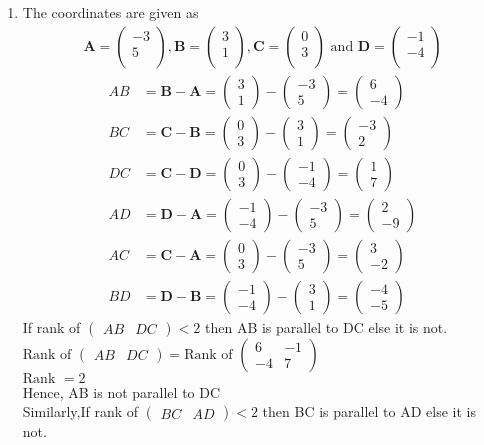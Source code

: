 \documentclass[12pt]{article}
\newcommand{\myvec}[1]{\ensuremath{\begin{pmatrix}#1\end{pmatrix}}}
\let\vec\mathbf
\begin{document}
\begin{enumerate}
\item The coordinates are given as
	\begin{align}
	\vec{A} = \myvec{
		-3\\
		5\\
		},
	\vec{B} = \myvec{
		3\\
		1\\
		},
	\vec{C} = \myvec{
		0\\
		3\\
		} \text{ and }
	\vec{D} = \myvec{
		-1\\
		-4\\
		}
	\end{align}
	\begin{align}
		AB &= \vec{B} - \vec{A} = \myvec{3\\1} - \myvec{-3\\5} = \myvec{6\\-4}\\
		BC &= \vec{C} - \vec{B} = \myvec{0\\3} - \myvec{3\\1} = \myvec{-3\\2}\\
		DC &= \vec{C} - \vec{D} = \myvec{0\\3} - \myvec{-1\\-4} = \myvec{1\\7}\\
		AD &= \vec{D} - \vec{A} = \myvec{-1\\-4} - \myvec{-3\\5} = \myvec{2\\-9}\\
		AC &= \vec{C} - \vec{A} = \myvec{0\\3} - \myvec{-3\\5} = \myvec{3\\-2}\\
		BD &= \vec{D} - \vec{B} = \myvec{-1\\-4} - \myvec{3\\1} = \myvec{-4\\-5}
	\end{align}
	If rank of $\myvec{AB & DC} < 2$ then AB is parallel to DC else it is not.\\
	$\text{Rank of } \myvec{AB & DC} = \text{Rank of }\myvec{6&-1\\-4&7}$\\
	$\text{Rank } = 2$\\
	Hence, AB is not parallel to DC\\
	Similarly,If rank of $\myvec{BC & AD} < 2$ then BC is parallel to AD else it is not.\\

\end{enumerate}
\end{document}
